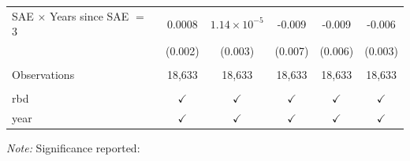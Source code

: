 \begin{table}[htbp]
{{\begin{tabular}{lccccc}
      SAE $\times$ Years since SAE $=$ 3   & 0.0008         & $1.14\times 10^{-5}$  & -0.009        & -0.009        & -0.006\\   
                                           & (0.002)        & (0.003)               & (0.007)       & (0.006)       & (0.003)\\   
       \\
      Observations                         & 18,633         & 18,633                & 18,633        & 18,633        & 18,633\\  
       \\
      rbd                                  & $\checkmark$   & $\checkmark$          & $\checkmark$  & $\checkmark$  & $\checkmark$\\   
      year                                 & $\checkmark$   & $\checkmark$          & $\checkmark$  & $\checkmark$  & $\checkmark$\\   
      \bottomrule
   \end{tabular}
}}

\vspace{0.2cm}
{\footnotesize \emph{Note:} Significance reported:}
\end{table}
